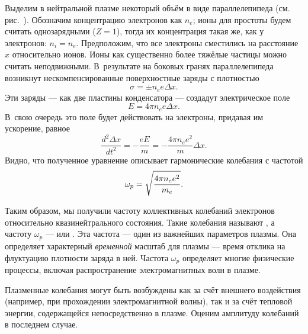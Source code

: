 Выделим в нейтральной плазме некоторый объём в виде параллелепипеда
(см. рис.~).
Обозначим концентрацию электронов как $n_e$; ионы для простоты будем считать
однозарядными ($Z=1$), тогда их концентрация такая же, как у электронов: $n_i=n_e$.
Предположим, что все электроны сместились на расстояние $x$ относительно ионов.
Ионы как существенно более тяжёлые частицы можно считать неподвижными.
В~результате на боковых гранях параллелепипеда возникнут нескомпенсированные
поверхностные заряды с плотностью
\begin{equation*}
    \sigma = \pm n_e e \Delta x.
\end{equation*}
Эти заряды --- как две пластины конденсатора --- создадут электрическое поле
\begin{equation*}
    E=4\pi n_e e \Delta x.
\end{equation*}
В~свою очередь это поле будет действовать на электроны,
придавая им ускорение, равное
\begin{equation*}
    \frac{d^2\Delta x}{dt^2}=-\frac{eE}{m}=-\frac{4\pi n_e e^2}{m} \Delta x.
\end{equation*}
Видно, что полученное уравнение описывает гармонические колебания с частотой
\begin{equation}
    \eqmark{plasma-freq}
    \omega_p=\sqrt{\frac{4\pi n_e e^2}{m_e}}.
\end{equation}

Таким образом, мы получили частоту коллективных колебаний
электронов относительно квазинейтрального состояния. Такие колебания
называют , а частоту $\omega_p$ ---
 или . Эта частота ---
один из важнейших параметров плазмы.
Она определяет характерный \emph{временной} масштаб для плазмы --- время
отклика на флуктуацию плотности заряда в ней. Частота $\omega_p$
определяет многие физические процессы, включая распространение 
электромагнитных волн в плазме.


\label{sec:debye_rad}

Плазменные колебания могут быть возбуждены как за счёт внешнего воздействия
(например, при прохождении электромагнитной волны), так и за счёт
тепловой энергии, содержащейся непосредственно в плазме.
Оценим амплитуду колебаний в последнем случае.

